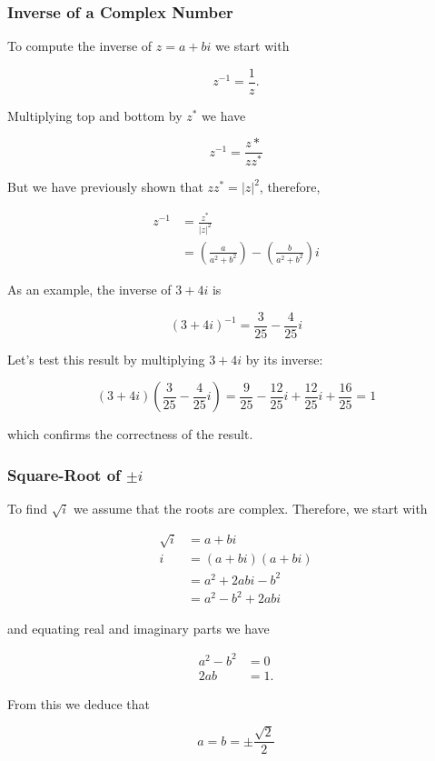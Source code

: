 \documentclass[10pt]{article}
\begin{document}
\subsubsection{Inverse of a Complex Number}
To compute the inverse of $z=a+b i$ we start with

$$
z^{-1}=\frac{1}{z} .
$$

Multiplying top and bottom by $z^{*}$ we have

$$
z^{-1}=\frac{z *}{z z^{*}}
$$

But we have previously shown that $z z^{*}=|z|^{2}$, therefore,

$$
\begin{aligned}
z^{-1} & =\frac{z^{*}}{|z|^{2}} \\
& =\left(\frac{a}{a^{2}+b^{2}}\right)-\left(\frac{b}{a^{2}+b^{2}}\right) i
\end{aligned}
$$

As an example, the inverse of $3+4 i$ is

$$
(3+4 i)^{-1}=\frac{3}{25}-\frac{4}{25} i
$$

Let's test this result by multiplying $3+4 i$ by its inverse:

$$
(3+4 i)\left(\frac{3}{25}-\frac{4}{25} i\right)=\frac{9}{25}-\frac{12}{25} i+\frac{12}{25} i+\frac{16}{25}=1
$$

which confirms the correctness of the result.

\subsubsection{Square-Root of $\pm i$}
To find $\sqrt{i}$ we assume that the roots are complex. Therefore, we start with

$$
\begin{aligned}
\sqrt{i} & =a+b i \\
i & =(a+b i)(a+b i) \\
& =a^{2}+2 a b i-b^{2} \\
& =a^{2}-b^{2}+2 a b i
\end{aligned}
$$

and equating real and imaginary parts we have

$$
\begin{aligned}
a^{2}-b^{2} & =0 \\
2 a b & =1 .
\end{aligned}
$$

From this we deduce that

$$
a=b= \pm \frac{\sqrt{2}}{2}
$$
\end{document}
